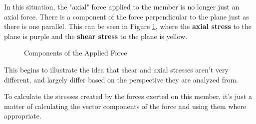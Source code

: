 \documentclass[12pt]{article}
\begin{document}
In this situation, the "axial" force applied to the member is no longer just an axial force. There is a component of the force perpendicular to the plane just as there is one parallel. This can be seen in Figure \ref{fig:013}, where the {\color{ma} \textbf{axial stress}} to the plane is purple and the {\color{ye} \textbf{shear stress}} to the plane is yellow.

\begin{figure}[H]
  \centering
  
  \caption{Components of the Applied Force}
  \label{fig:013}
\end{figure}

This begins to illustrate the idea that shear and axial stresses aren't very different, and largely differ based on the perspective they are analyzed from.

To calculate the stresses created by the forces exerted on this member, it's just a matter of calculating the vector components of the force and using them where appropriate.
\end{document}
